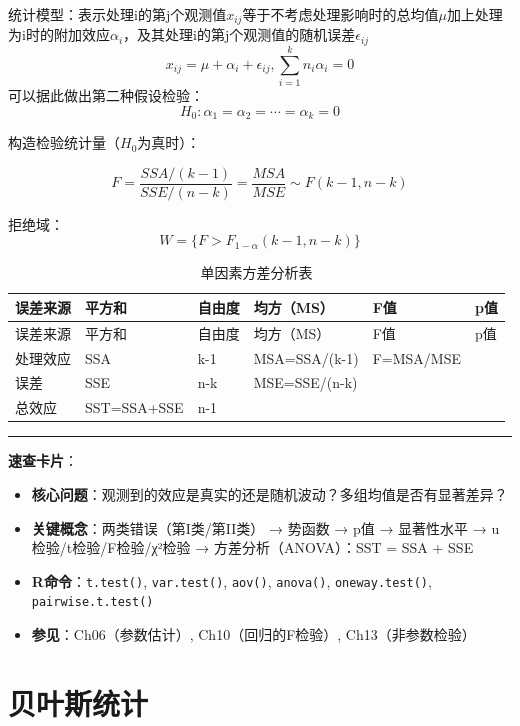 \documentclass[
]{book}
\providecommand{\tightlist}{%
  \setlength{\itemsep}{0pt}\setlength{\parskip}{0pt}}
\begin{document}
统计模型：表示处理i的第j个观测值\(x_{ij}\)等于不考虑处理影响时的总均值\(\mu\)加上处理为i时的附加效应\(\alpha_i\)，及其处理i的第j个观测值的随机误差\(\epsilon_{ij}\)
\[
x_{ij}=\mu+\alpha_i+\epsilon_{ij},\sum_{i=1}^kn_i\alpha_i=0
\] 可以据此做出第二种假设检验： \[
H_0:\alpha_1=\alpha_2=\cdots=\alpha_k=0
\]

构造检验统计量（\(H_0\)为真时）：

\[
F=\frac{SSA/(k-1)}{SSE/(n-k)} = \frac{MSA}{MSE}\sim F(k-1,n-k)
\]

拒绝域： \[
W = \{F>F_{1-\alpha}(k-1,n-k) \}
\]

\begin{longtable}[]{@{}llllll@{}}
\caption{单因素方差分析表}\tabularnewline
\toprule\noalign{}
误差来源 & 平方和 & 自由度 & 均方（MS） & F值 & p值 \\
\midrule\noalign{}
\endfirsthead
\toprule\noalign{}
误差来源 & 平方和 & 自由度 & 均方（MS） & F值 & p值 \\
\midrule\noalign{}
\endhead
\bottomrule\noalign{}
\endlastfoot
处理效应 & SSA & k-1 & MSA=SSA/(k-1) & F=MSA/MSE & \\
误差 & SSE & n-k & MSE=SSE/(n-k) & & \\
总效应 & SST=SSA+SSE & n-1 & & & \\
\end{longtable}

\begin{center}\rule{0.5\linewidth}{0.5pt}\end{center}

\textbf{速查卡片}：

\begin{itemize}
\tightlist
\item
  \textbf{核心问题}：观测到的效应是真实的还是随机波动？多组均值是否有显著差异？
\item
  \textbf{关键概念}：两类错误（第I类/第II类） → 势函数 → p值 → 显著性水平 → u检验/t检验/F检验/χ²检验 → 方差分析（ANOVA）：SST = SSA + SSE
\item
  \textbf{R命令}：\texttt{t.test()}, \texttt{var.test()}, \texttt{aov()}, \texttt{anova()}, \texttt{oneway.test()}, \texttt{pairwise.t.test()}
\item
  \textbf{参见}：Ch06（参数估计）, Ch10（回归的F检验）, Ch13（非参数检验）
\end{itemize}

\chapter{贝叶斯统计}\label{ux8d1dux53f6ux65afux7edfux8ba1}
\end{document}
